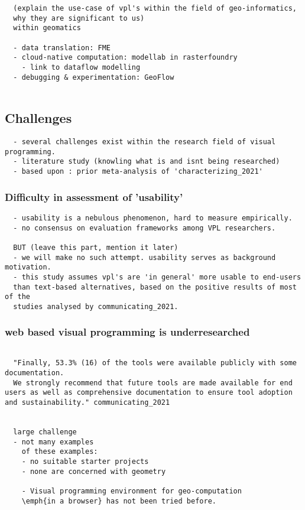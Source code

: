 \begin{lstlisting}
  (explain the use-case of vpl's within the field of geo-informatics, 
  why they are significant to us) 
  within geomatics

  - data translation: FME 
  - cloud-native computation: modellab in rasterfoundry
    - link to dataflow modelling
  - debugging & experimentation: GeoFlow 
  
\end{lstlisting}



\newpage
\subsection{Challenges}
\begin{lstlisting}
  - several challenges exist within the research field of visual programming. 
  - literature study (knowling what is and isnt being researched)
  - based upon : prior meta-analysis of 'characterizing_2021'
\end{lstlisting}

\subsubsection*{Difficulty in assessment of 'usability'}
\begin{lstlisting}
  - usability is a nebulous phenomenon, hard to measure empirically.
  - no consensus on evaluation frameworks among VPL researchers. 

  BUT (leave this part, mention it later)
  - we will make no such attempt. usability serves as background motivation. 
  - this study assumes vpl's are 'in general' more usable to end-users 
  than text-based alternatives, based on the positive results of most of the 
  studies analysed by communicating_2021.   
\end{lstlisting}


\subsubsection*{web based visual programming is underresearched}
\begin{lstlisting}

  "Finally, 53.3% (16) of the tools were available publicly with some documentation. 
  We strongly recommend that future tools are made available for end users as well as comprehensive documentation to ensure tool adoption and sustainability." communicating_2021 
  

  large challenge
  - not many examples
    of these examples: 
    - no suitable starter projects
    - none are concerned with geometry

    - Visual programming environment for geo-computation 
    \emph{in a browser} has not been tried before. 

\end{lstlisting}


